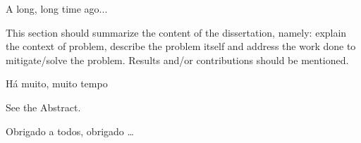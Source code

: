 


A long, long time ago... 

This section should summarize the content of the dissertation, namely: explain the context of problem, describe the problem itself and address the work done to mitigate/solve the problem. Results and/or contributions should be mentioned.

Há muito, muito tempo

See the Abstract.



Obrigado a todos, obrigado \ldots
